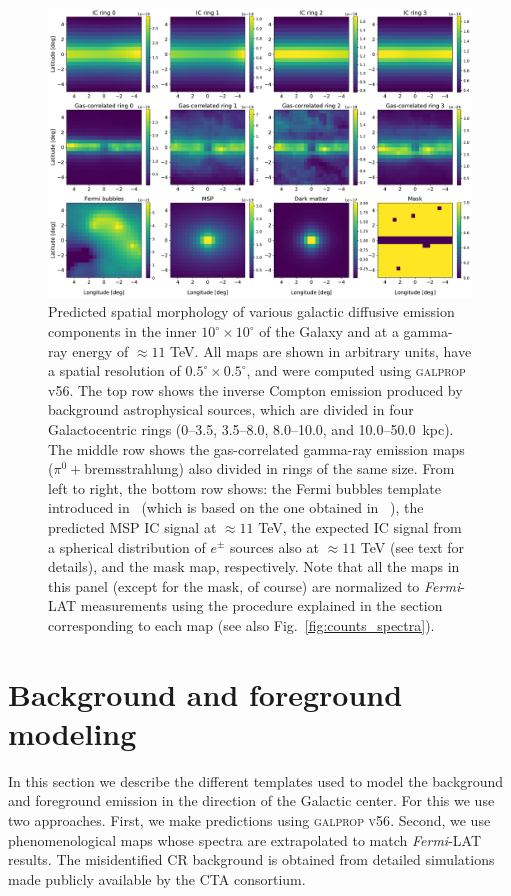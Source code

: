 \documentclass[doublespace,nopageskip]{VTthesis} %
\begin{document}
\begin{figure}[htb!]
    \centering
    \includegraphics[width=\textwidth]{Figures/CTA/maps_orig.pdf}
    \caption{Predicted spatial morphology of various galactic diffusive emission components in the inner $10^\circ \times 10^\circ$ of the Galaxy and at a gamma-ray energy of $\approx 11$ TeV. All maps are shown in arbitrary units, have a spatial resolution of $0.5^\circ \times 0.5^\circ$, and were computed using \textsc{galprop} v56. The top row shows the inverse Compton emission produced by background astrophysical sources, which are divided in four Galactocentric rings (0--3.5, 3.5--8.0, 8.0--10.0, and 10.0--50.0~kpc). The middle row shows the gas-correlated gamma-ray emission maps ($\pi^0+$bremsstrahlung) also divided in rings of the same size. From left to right, the bottom row shows: the Fermi bubbles template introduced in~\citet{2019JCAP...09..042M} (which is based on the one obtained in ~\citet{2014ApJ...793...64A}), the predicted MSP IC signal at $\approx 11$ TeV, the expected IC signal from a spherical distribution of $e^{\pm}$ sources also at $\approx 11$ TeV (see text for details), and the mask map, respectively. Note that all the maps in this panel (except for the mask, of course) are normalized to \textit{Fermi}-LAT measurements using the procedure explained in the section corresponding to each map (see also Fig.~\ref{fig:counts_spectra}).}
    \label{fig:galpropmaps}
\end{figure}

\section{Background and foreground modeling}
\label{sec:backgroundtemplates}
In this section we describe the different templates used to model the background and foreground emission in the direction of the Galactic center. For this we use two approaches. First, we make predictions using \textsc{galprop v56}. Second, we use phenomenological maps whose spectra are extrapolated to match \textit{Fermi}-LAT results. The misidentified CR background is obtained from detailed simulations made publicly available by the CTA consortium.
\end{document}
